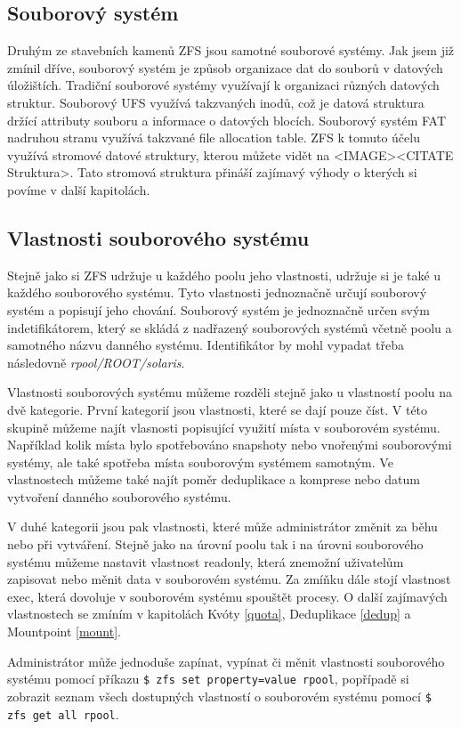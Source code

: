     \subsection{Souborový systém}
    Druhým ze stavebních kamenů ZFS jsou samotné souborové systémy. Jak jsem již zmínil dříve, souborový systém je způsob organizace dat do souborů v datových úložištích.
    Tradiční souborové systémy využívají k organizaci různých datových struktur. Souborový UFS využívá takzvaných inodů, což je datová struktura držící attributy souboru a informace o datových blocích. Souborový systém FAT nadruhou stranu využívá takzvané file allocation table. ZFS k tomuto účelu využívá stromové datové struktury, kterou můžete vidět na <IMAGE><CITATE Struktura>. Tato stromová struktura přináší zajímavý výhody o kterých si povíme v další kapitolách.
    \subsection{Vlastnosti souborového systému} 
    Stejně jako si ZFS udržuje u každého poolu jeho vlastnosti, udržuje si je také u každého souborového systému. Tyto vlastnosti jednoznačně určují souborový systém a popisují jeho chování. Souborový systém je jednoznačně určen svým indetifikátorem, který se skládá z nadřazený souborových systémů včetně poolu a samotného názvu danného systému. Identifikátor by mohl vypadat třeba následovně \emph{rpool/ROOT/solaris}.
    
    Vlastnosti souborových systému můžeme rozděli stejně jako u vlastností poolu na dvě kategorie. První kategorií jsou vlastnosti, které se dají pouze číst. V této skupině můžeme najít vlasnosti popisující využití místa v souborovém systému. Například kolik místa bylo spotřebováno snapshoty nebo vnořenými souborovými systémy, ale také spotřeba místa souborovým systémem samotným. Ve vlastnostech můžeme také najít poměr deduplikace a komprese nebo datum vytvoření danného souborového systému.
    
    V duhé kategorii jsou pak vlastnosti, které může administrátor změnit za běhu nebo při vytváření. Stejně jako na úrovní poolu tak i na úrovni souborového systému můžeme nastavit vlastnost readonly, která znemožní uživatelům zapisovat nebo měnit data v souborovém systému. Za zmíňku dále stojí vlastnost exec, která dovoluje v souborovém systému spouštět procesy. O další zajímavých vlastnostech se zmíním v kapitolách Kvóty \ref{quota}, Deduplikace \ref{dedup} a Mountpoint \ref{mount}.
    
    Administrátor může jednoduše zapínat, vypínat či měnit vlastnosti souborového systému pomocí příkazu \verb|$ zfs set property=value rpool|, popřípadě si zobrazit seznam všech dostupných vlastností o souborovém systému pomocí \verb|$ zfs get all rpool|.
    
